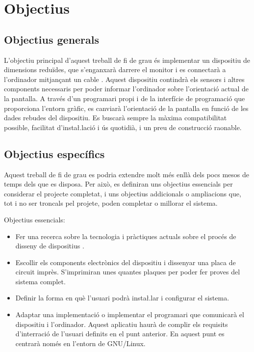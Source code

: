 \chapter{Objectius}
\label{cap:objectius}

\section{Objectius generals}

L'objectiu principal d'aquest treball de fi de grau és implementar un dispositiu
de dimensions reduïdes, que s'enganxarà darrere el monitor i es connectarà
a l'ordinador mitjançant un cable . Aquest dispositiu contindrà els
sensors i altres components necessaris per poder informar l'ordinador sobre
l'orientació actual de la pantalla. A través d'un programari propi i de la
interfície de programació que proporciona l'entorn gràfic, es canviarà
l'orientació de la pantalla en funció de les dades rebudes del dispositiu. Es
buscarà sempre la màxima compatibilitat possible, facilitat d'insta\l.lació i
ús quotidià, i un preu de construcció raonable.


\section{Objectius específics}

Aquest treball de fi de grau es podria extendre molt més enllà dels pocs mesos
de temps dels que es disposa. Per això, es definiran uns objectius essencials
per considerar el projecte completat, i uns objectius addicionals o
ampliacions que, tot i no ser troncals pel projete, poden completar o
millorar el sistema.

Objectius essencials:
\begin{itemize}
    \item Fer una recerca sobre la tecnologia i pràctiques actuals sobre el 
    procés de disseny de dispositius .
    \item Escollir els components electrònics del dispositiu i dissenyar una
    placa de circuit imprès. S'imprimiran unes quantes plaques per poder fer
    proves del sistema complet.
    \item Definir la forma en què l'usuari podrà insta\l.lar i configurar
    el sistema.
    \item Adaptar una implementació o implementar el programari que comunicarà
    el dispositiu i l'ordinador. Aquest aplicatiu haurà de complir els
    requisits d'interració de l'usuari definits en el punt anterior. En aquest
    punt es centrarà només en l'entorn de GNU/Linux.
\end{itemize}

